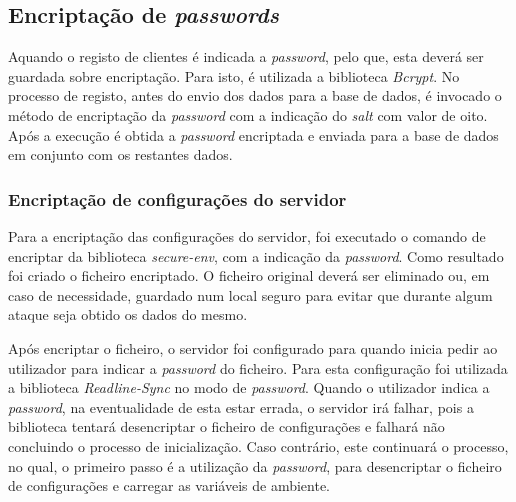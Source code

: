 \subsection{Encriptação de \textit{passwords}}
Aquando o registo de clientes é indicada a \textit{password}, pelo que, esta deverá ser guardada sobre encriptação. Para isto, é utilizada a biblioteca \textit{Bcrypt}. No processo de registo, antes do envio dos dados para a base de dados, é invocado o método de encriptação da \textit{password} com a indicação do \textit{salt} com valor de oito. Após a execução é obtida a \textit{password} encriptada e enviada para a base de dados em conjunto com os restantes dados.

\subsubsection{Encriptação de configurações do servidor}
Para a encriptação das configurações do servidor, foi executado o comando de encriptar da biblioteca \textit{secure-env}, com a indicação da \textit{password}. Como resultado foi criado o ficheiro encriptado. O ficheiro original deverá ser eliminado ou, em caso de necessidade, guardado num local seguro para evitar que durante algum ataque seja obtido os dados do mesmo.

Após encriptar o ficheiro, o servidor foi configurado para quando inicia pedir ao utilizador para indicar a \textit{password} do ficheiro. Para esta configuração foi utilizada a biblioteca \textit{Readline-Sync} no modo de \textit{password}. Quando o utilizador indica a \textit{password}, na eventualidade de esta estar errada, o servidor irá falhar, pois a biblioteca tentará desencriptar o ficheiro de configurações e falhará não concluindo o processo de inicialização. Caso contrário, este continuará o processo, no qual, o primeiro passo é a utilização da \textit{password}, para desencriptar o ficheiro de configurações e carregar as variáveis de ambiente.